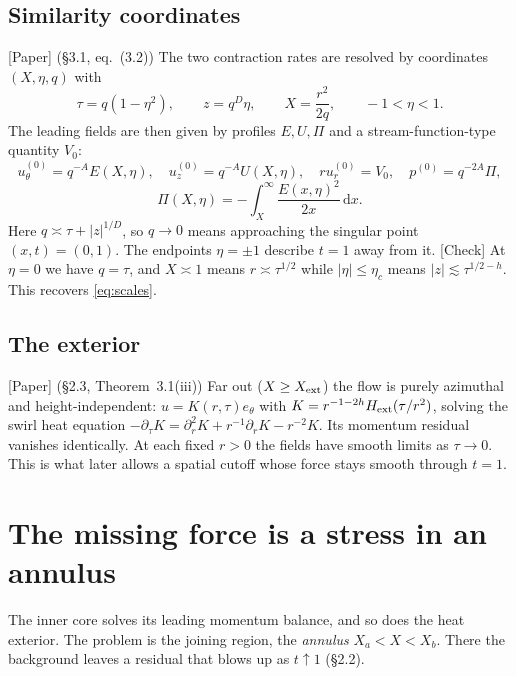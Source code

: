 \documentclass[11pt]{article}
\newcommand{\dd}{\,\mathrm{d}}
\theoremstyle{plain}
\theoremstyle{remark}
\newcommand{\paper}{\textsf{\small[Paper]}}
\newcommand{\chk}{\textsf{\small[Check]}}
\begin{document}
\subsection{Similarity coordinates}
\paper{} (\S3.1, eq.~(3.2)) The two contraction rates are resolved by coordinates $(X,\eta,q)$ with
\[
\tau=q(1-\eta^2),\qquad z=q^{D}\eta,\qquad X=\frac{r^2}{2q},\qquad -1<\eta<1 .
\]
The leading fields are then given by profiles $E,U,\Pi$ and a stream-function-type quantity $V_0$:
\[
u_\theta^{(0)}=q^{-A}E(X,\eta),\quad u^{(0)}_z=q^{-A}U(X,\eta),\quad ru^{(0)}_r=V_0,\quad p^{(0)}=q^{-2A}\Pi,
\]
\[
\Pi(X,\eta)=-\!\int_X^\infty\frac{E(x,\eta)^2}{2x}\dd x .
\]
Here $q\asymp\tau+|z|^{1/D}$, so $q\to0$ means approaching the singular point $(x,t)=(0,1)$. The endpoints $\eta=\pm1$ describe $t=1$ away from it. \chk{} At $\eta=0$ we have $q=\tau$, and $X\asymp1$ means $r\asymp\tau^{1/2}$ while $|\eta|\le\eta_c$ means $|z|\lesssim\tau^{1/2-h}$. This recovers \eqref{eq:scales}.

\subsection{The exterior}
\paper{} (\S2.3, Theorem~3.1(iii)) Far out ($X\ge X_{\rm ext}$) the flow is purely azimuthal and height-independent: $u=K(r,\tau)e_\theta$ with $K=r^{-1-2h}H_{\rm ext}(\tau/r^2)$, solving the swirl heat equation $-\partial_\tau K=\partial_r^2K+r^{-1}\partial_rK-r^{-2}K$. Its momentum residual vanishes identically. At each fixed $r>0$ the fields have smooth limits as $\tau\to0$. This is what later allows a spatial cutoff whose force stays smooth through $t=1$.

\section{The missing force is a stress in an annulus}\label{sec:stress}

The inner core solves its leading momentum balance, and so does the heat exterior. The problem is the joining region, the \emph{annulus} $X_a<X<X_b$. There the background leaves a residual that blows up as $t\uparrow1$ (\S2.2).
\end{document}
